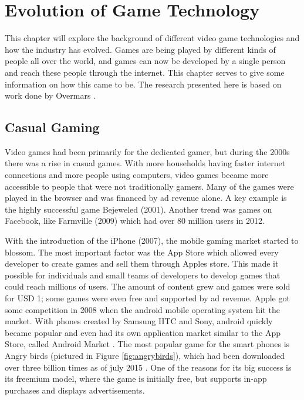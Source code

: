\chapter{Evolution of Game Technology}
\label{ch:gameshistory}
This chapter will explore the background of different video game technologies and how the industry has evolved. Games are being played by different kinds of people all over the world, and games can now be developed by a single person and reach these people through the internet. This chapter serves to give some information on how this came to be. The research presented here is based on work done by Overmars \cite{overmars2012}.

\section{Casual Gaming}
\label{sec:casualgaming}
Video games had been primarily for the dedicated gamer, but during the 2000s there was a rise in casual games. With more households having faster internet connections and more people using computers, video games became more accessible to people that were not traditionally gamers. Many of the games were played in the browser and was financed by ad revenue alone. A key example is the highly successful game Bejeweled (2001). Another trend was games on Facebook, like Farmville (2009) which had over 80 million users in 2012.

With the introduction of the iPhone (2007), the mobile gaming market started to blossom. The most important factor was the App Store which allowed every developer to create games and sell them through Apples store. This made it possible for individuals and small teams of developers to develop games that could reach millions of users. The amount of content grew and games were sold for USD 1; some games were even free and supported by ad revenue. Apple got some competition in 2008 when the android mobile operating system hit the market. With phones created by Samsung HTC and Sony, android quickly became popular and even had its own application market similar to the App Store, called Android Market \cite{2015android}. The most popular game for the smart phones is Angry birds (pictured in Figure \ref{fig:angrybirds}), which had been downloaded over three billion times as of july 2015 \cite{2015forbes}. One of the reasons for its big success is its freemium model, where the game is initially free, but supports in-app purchases and displays advertisements.

